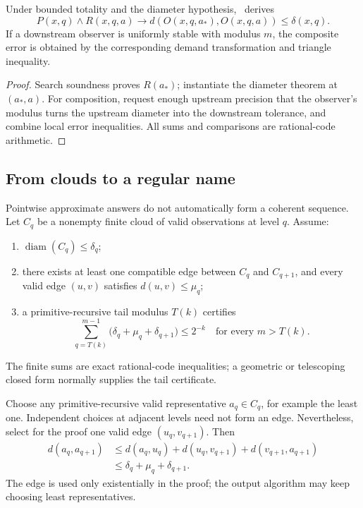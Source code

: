 \begin{theorem}\label{thm:stable-approx}
Under bounded totality and the diameter hypothesis, \iPRA\ derives
\[
 P(x,q)\wedge R(x,q,a)
 \longrightarrow d(O(x,q,a_*),O(x,q,a))\le\delta(x,q).
\]
If a downstream observer is uniformly stable with modulus \(m\), the composite error is obtained by the corresponding demand transformation and triangle inequality.
\end{theorem}

\begin{proof}
Search soundness proves \(R(a_*)\); instantiate the diameter theorem at \((a_*,a)\).  For composition, request enough upstream precision that the observer's modulus turns the upstream diameter into the downstream tolerance, and combine local error inequalities.  All sums and comparisons are rational-code arithmetic.
\end{proof}

\subsection{From clouds to a regular name}

Pointwise approximate answers do not automatically form a coherent sequence.  Let \(C_q\) be a nonempty finite cloud of valid observations at level \(q\).  Assume:
\begin{enumerate}[label=(\alph*)]
  \item \(\operatorname{diam}(C_q)\le\delta_q\);
  \item there exists at least one compatible edge between \(C_q\) and \(C_{q+1}\), and every valid edge \((u,v)\) satisfies \(d(u,v)\le\mu_q\);
  \item a primitive-recursive tail modulus \(T(k)\) certifies
  \[
    \sum_{q=T(k)}^{m-1}\bigl(\delta_q+\mu_q+\delta_{q+1}\bigr)\le 2^{-k}
    \quad\text{for every }m>T(k).
  \]
\end{enumerate}
The finite sums are exact rational-code inequalities; a geometric or telescoping closed form normally supplies the tail certificate.

Choose any primitive-recursive valid representative \(a_q\in C_q\), for example the least one.  Independent choices at adjacent levels need not form an edge.  Nevertheless, select for the proof one valid edge \((u_q,v_{q+1})\).  Then
\begin{align*}
 d(a_q,a_{q+1})
 &\le d(a_q,u_q)+d(u_q,v_{q+1})+d(v_{q+1},a_{q+1})\\
 &\le \delta_q+\mu_q+\delta_{q+1}.
\end{align*}
The edge is used only existentially in the proof; the output algorithm may keep choosing least representatives.

